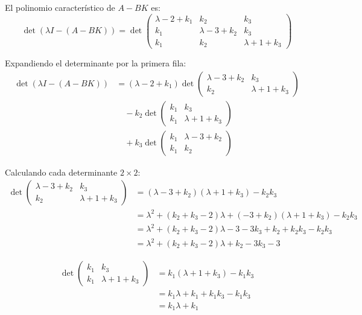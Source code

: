 \documentclass[
  11pt,
  letterpaper,
   addpoints,
   answers
  ]{exam}
\begin{document}
\begin{questions}
\begin{parts}
\begin{solution}
        El polinomio característico de $A - BK$ es:
        \begin{equation}
            \det(\lambda I - (A-BK)) = \det\begin{pmatrix} \lambda-2+k_1 & k_2 & k_3\\ k_1 & \lambda-3+k_2 & k_3\\ k_1 & k_2 & \lambda+1+k_3 \end{pmatrix}
        \end{equation}

        Expandiendo el determinante por la primera fila:
        \begin{align}
            \det(\lambda I - (A-BK)) &= (\lambda-2+k_1)\det\begin{pmatrix} \lambda-3+k_2 & k_3\\ k_2 & \lambda+1+k_3 \end{pmatrix}\nonumber\\
            &\quad - k_2\det\begin{pmatrix} k_1 & k_3\\ k_1 & \lambda+1+k_3 \end{pmatrix}\nonumber\\
            &\quad + k_3\det\begin{pmatrix} k_1 & \lambda-3+k_2\\ k_1 & k_2 \end{pmatrix}
        \end{align}

        Calculando cada determinante $2\times 2$:
        \begin{align}
            \det\begin{pmatrix} \lambda-3+k_2 & k_3\\ k_2 & \lambda+1+k_3 \end{pmatrix} &= (\lambda-3+k_2)(\lambda+1+k_3) - k_2k_3\\
            &= \lambda^2 + (k_2+k_3-2)\lambda + (-3+k_2)(\lambda+1+k_3) - k_2k_3\\
            &= \lambda^2 + (k_2+k_3-2)\lambda - 3 - 3k_3 + k_2 + k_2k_3 - k_2k_3\\
            &= \lambda^2 + (k_2+k_3-2)\lambda + k_2 - 3k_3 - 3
        \end{align}

        \begin{align}
            \det\begin{pmatrix} k_1 & k_3\\ k_1 & \lambda+1+k_3 \end{pmatrix} &= k_1(\lambda+1+k_3) - k_1k_3\\
            &= k_1\lambda + k_1 + k_1k_3 - k_1k_3\\
            &= k_1\lambda + k_1
        \end{align}


\end{solution}
\end{parts}
\end{questions}
\end{document}
